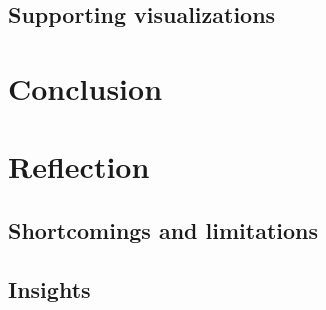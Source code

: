 \documentclass[letterpaper,10pt,english]{sphinxmanual}
\begin{document}
\section{Supporting visualizations}
\label{section3:supporting-visualizations}

\chapter{Conclusion}
\label{section4::doc}\label{section4:conclusion}

\chapter{Reflection}
\label{section5::doc}\label{section5:reflection}

\section{Shortcomings and limitations}
\label{section5:shortcomings-and-limitations}

\section{Insights}
\label{section5:insights}


\renewcommand{\indexname}{Index}
\printindex
\end{document}
